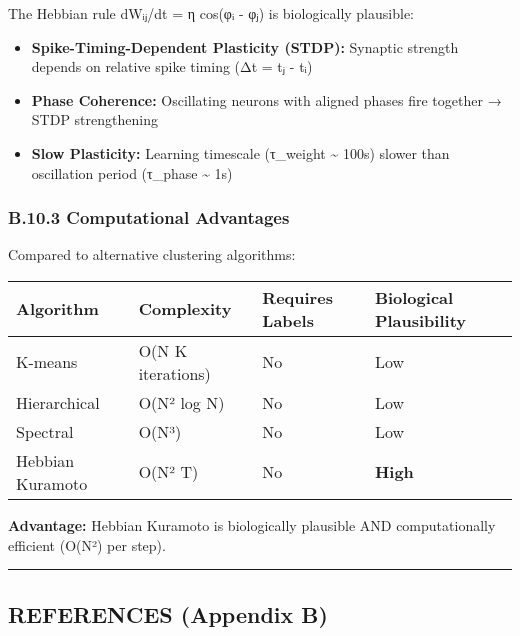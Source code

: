 \documentclass[
]{article}
\newcounter{none} %
\providecommand{\tightlist}{%
  \setlength{\itemsep}{0pt}\setlength{\parskip}{0pt}}
\begin{document}
The Hebbian rule dWᵢⱼ/dt = η cos(φᵢ - φⱼ) is biologically plausible:

\begin{itemize}
\tightlist
\item
  \textbf{Spike-Timing-Dependent Plasticity (STDP):} Synaptic strength
  depends on relative spike timing (Δt = tⱼ - tᵢ)
\item
  \textbf{Phase Coherence:} Oscillating neurons with aligned phases fire
  together → STDP strengthening
\item
  \textbf{Slow Plasticity:} Learning timescale (τ\_weight
  \textasciitilde{} 100s) slower than oscillation period (τ\_phase
  \textasciitilde{} 1s)
\end{itemize}

\subsubsection{B.10.3 Computational
Advantages}\label{b.10.3-computational-advantages}

Compared to alternative clustering algorithms:

{\def\LTcaptype{none} %
\begin{longtable}[]{@{}llll@{}}
\toprule\noalign{}
Algorithm & Complexity & Requires Labels & Biological Plausibility \\
\midrule\noalign{}
\endhead
\bottomrule\noalign{}
\endlastfoot
K-means & O(N K iterations) & No & Low \\
Hierarchical & O(N² log N) & No & Low \\
Spectral & O(N³) & No & Low \\
Hebbian Kuramoto & O(N² T) & No & \textbf{High} \\
\end{longtable}
}

\textbf{Advantage:} Hebbian Kuramoto is biologically plausible AND
computationally efficient (O(N²) per step).

\begin{center}\rule{0.5\linewidth}{0.5pt}\end{center}

\subsection{REFERENCES (Appendix B)}\label{references-appendix-b}
\end{document}
